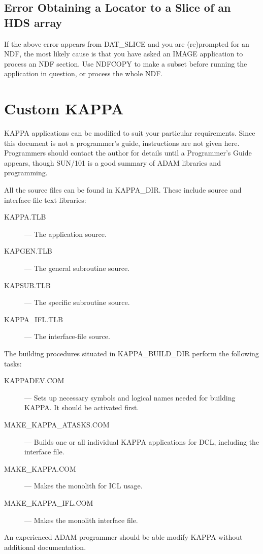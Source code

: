 {\subsection{Error Obtaining a Locator to a Slice of an HDS array}
If the above error appears from DAT\_SLICE and you are (re)prompted
for an NDF, the most likely cause is that you have asked an IMAGE
application to process an NDF section.  Use NDFCOPY to make a
subset before running the application in question, or process the
whole NDF.

\section{Custom KAPPA}
\label{se:custom}

KAPPA applications can be modified to suit your particular requirements.
Since this document is not a programmer's guide, instructions are not
given here.  Programmers should contact the author for details until a
Programmer's Guide appears, though SUN/101 is a good summary of
{\small ADAM} libraries and programming.

All the source files can be found in KAPPA\_DIR.  These include
source and interface-file text libraries:
\begin{description}
\item [KAPPA.TLB] --- The application source.
\item [KAPGEN.TLB] --- The general subroutine source.
\item [KAPSUB.TLB] --- The specific subroutine source.
\item [KAPPA\_IFL.TLB] --- The interface-file source.
\end{description}
    
The building procedures situated in KAPPA\_BUILD\_DIR perform the
following tasks:
\begin{description}
\item [KAPPADEV.COM] --- Sets up necessary symbols and logical
names needed for building KAPPA.  It should be activated first.
\item [MAKE\_KAPPA\_ATASKS.COM] --- Builds one or all individual KAPPA
applications for DCL, including the interface file.
\item [MAKE\_KAPPA.COM]  --- Makes the monolith for ICL usage.
\item [MAKE\_KAPPA\_IFL.COM] --- Makes the monolith interface file.
\end{description}

An experienced {\small ADAM} programmer should be able modify {\small
KAPPA} without additional documentation. 

}
